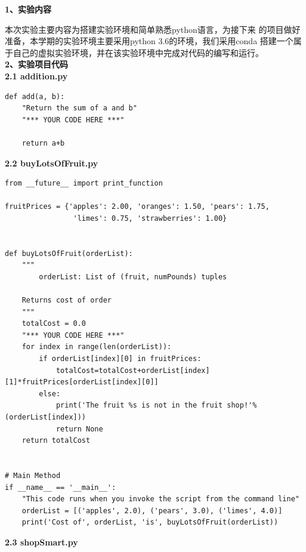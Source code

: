 \documentclass[a4paper,12pt,UTF8]{article}
\begin{document}
\begin{flushleft}
    {
       \large{
            \textbf{1、实验内容\\}
            
       }
       \normalsize{
        \hspace{1cm}本次实验主要内容为搭建实验环境和简单熟悉python语言，为接下来
        的项目做好准备，本学期的实验环境主要采用python 3.6的环境，我们采用conda
        搭建一个属于自己的虚拟实验环境，并在该实验环境中完成对代码的编写和运行。\\
       }
       \large{
        \textbf{2、实验项目代码\\}
       }
       \normalsize{
            \textbf{2.1 addition.py\\}
       }
       \scriptsize{
        \begin{lstlisting}
def add(a, b):
    "Return the sum of a and b"
    "*** YOUR CODE HERE ***"

    return a+b        
        \end{lstlisting}                   
       }

       \normalsize{
            \textbf{2.2 buyLotsOfFruit.py\\}
       }
       \scriptsize{
        \begin{lstlisting}
from __future__ import print_function

fruitPrices = {'apples': 2.00, 'oranges': 1.50, 'pears': 1.75,
                'limes': 0.75, 'strawberries': 1.00}


def buyLotsOfFruit(orderList):
    """
        orderList: List of (fruit, numPounds) tuples

    Returns cost of order
    """
    totalCost = 0.0
    "*** YOUR CODE HERE ***"
    for index in range(len(orderList)):
        if orderList[index][0] in fruitPrices:
            totalCost=totalCost+orderList[index][1]*fruitPrices[orderList[index][0]]
        else:
            print('The fruit %s is not in the fruit shop!'%(orderList[index]))
            return None
    return totalCost


# Main Method
if __name__ == '__main__':
    "This code runs when you invoke the script from the command line"
    orderList = [('apples', 2.0), ('pears', 3.0), ('limes', 4.0)]
    print('Cost of', orderList, 'is', buyLotsOfFruit(orderList))
        \end{lstlisting}                   
       }

       \normalsize{
        \textbf{2.3 shopSmart.py\\}
       
}}
\end{flushleft}
\end{document}

